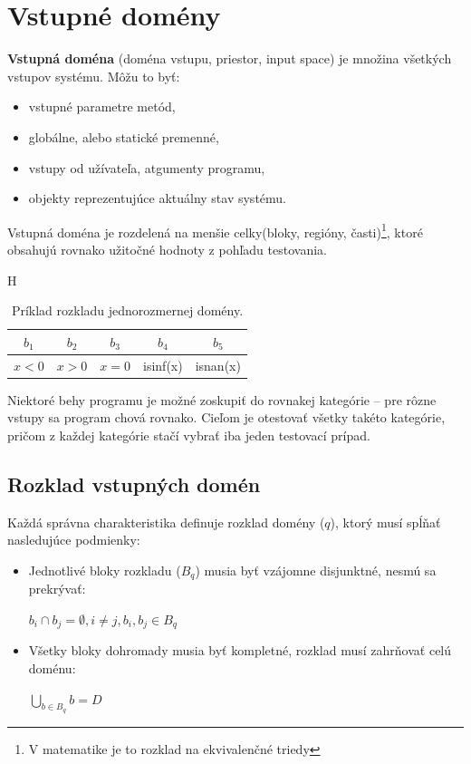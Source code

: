 \section{Vstupné domény}
\label{vstupne_domeny}
\textbf{Vstupná doména} (doména vstupu, priestor, input space) je množina všetkých vstupov systému.
Môžu to byť:
\begin{itemize}
	\item vstupné parametre metód,
	\item globálne, alebo statické premenné,
	\item vstupy od užívateľa, atgumenty programu,
	\item objekty reprezentujúce aktuálny stav systému.
\end{itemize}
Vstupná doména je rozdelená na menšie celky(bloky, regióny, časti)\footnote{V matematike je to rozklad na ekvivalenčné triedy}, ktoré obsahujú rovnako užitočné hodnoty z pohľadu testovania.
\begin{table}{H}
	\centering
	\begin{tabular}{ | c | c | c | c | c | }
		\hline
		$b_1$ & $b_2$ & $b_3$ & $b_4$ & $b_5$ \\
		\hline
		$x < 0$ & $x > 0$ & $x = 0$ & isinf(x) & isnan(x) \\
		\hline
	\end{tabular}
	\caption{Príklad rozkladu jednorozmernej domény.}
\end{table}

Niektoré behy programu je možné zoskupiť do rovnakej kategórie -- pre rôzne vstupy sa program chová rovnako.
Cieľom je otestovať všetky takéto kategórie, pričom z každej kategórie stačí vybrať iba jeden testovací prípad.

\subsection*{Rozklad vstupných domén}
\label{rozklad_domen}
Každá správna charakteristika definuje rozklad domény ($q$), ktorý musí spĺňať nasledujúce podmienky:
\begin{itemize}
	\item Jednotlivé bloky rozkladu ($B_q$) musia byť vzájomne disjunktné, nesmú sa prekrývať:
		\begin{center}
			$b_i \cap b_j = \emptyset, i \not = j, b_i, b_j \in B_q$
		\end{center}
	\item Všetky bloky dohromady musia byť kompletné, rozklad musí zahrňovať celú doménu:
		\begin{center}
			$\underset{b \in B_q}{\bigcup} b = D$
		\end{center}
\end{itemize}

